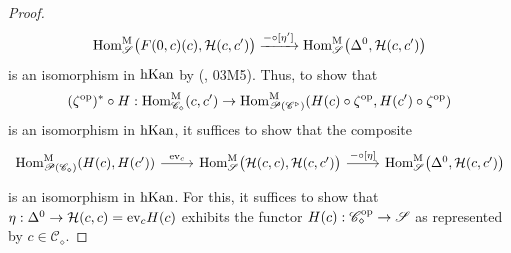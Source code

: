 \documentclass{tac}
\newcommand{\s}[1]{\mathscr{#1}}
\renewcommand{\c}[1]{\mathcal{#1}}
\newcommand{\tx}[1]{\textnormal{#1}}
\begin{document}
\begin{proof}
\[\tx{Hom}^\tx{M}_{\s{S}} \big( F(0,c)(c) , \c{H}(c,c') \big) \xrightarrow{-\circ [\eta' ]}  \tx{Hom}^\tx{M}_{\s{S}} \big( \Delta^0 , \c{H}(c,c') \big) \]
is an isomorphism in $\tx{hKan}$ by (\cite{kerodon}, 03M5).  Thus, to show that 
\[(\zeta^\tx{op})^* \circ H :  \tx{Hom}^\tx{M}_{\s{C}_\diamond } (c,c') \to \tx{Hom}^\tx{M}_{\s{P}(\s{C}^\triangleright )} (H(c)\circ \zeta^\tx{op} ,H(c')\circ \zeta^\tx{op} )\]
is an isomorphism in $\tx{hKan}$, it suffices to show that the composite 
\[\begin{tikzcd}
\tx{Hom}^\tx{M}_{\s{P}(\s{C}_\diamond )} (H(c),H(c'))  \arrow[]{r}{\tx{ev}_{c} } &   \tx{Hom}^\tx{M}_{\s{S}} \big( \c{H}(c,c) , \c{H}(c,c') \big) \arrow[]{r}{-\circ [\eta ]} & \tx{Hom}^\tx{M}_{\s{S}} \big( \Delta^0 , \c{H}(c,c') \big)
\end{tikzcd}\]
is an isomorphism in $\tx{hKan}$.  For this, it suffices to show that $\eta : \Delta^0 \to \c{H}(c,c) = \tx{ev}_c H(c)$ exhibits the functor $H(c) : \s{C}_\diamond^\tx{op} \to \s{S}$ as represented by $c\in \s{C}_\diamond$.  


\end{proof}
\end{document}
